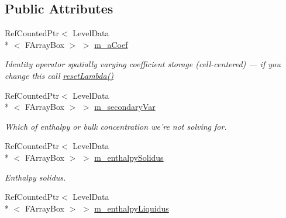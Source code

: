 \subsection*{Public Attributes}
\begin{DoxyCompactItemize}
\item 
\hypertarget{class_a_m_r_non_linear_v_c_op_ac338ad3b423fc508795f783a30b0eb7c}{Ref\-Counted\-Ptr$<$ Level\-Data\\*
$<$ F\-Array\-Box $>$ $>$ \hyperlink{class_a_m_r_non_linear_v_c_op_ac338ad3b423fc508795f783a30b0eb7c}{m\-\_\-a\-Coef}}\label{class_a_m_r_non_linear_v_c_op_ac338ad3b423fc508795f783a30b0eb7c}

\begin{DoxyCompactList}\small\item\em Identity operator spatially varying coefficient storage (cell-\/centered) --- if you change this call \hyperlink{class_a_m_r_non_linear_v_c_op_add4e1fcde22b295a038e786cf0c1152a}{reset\-Lambda()} \end{DoxyCompactList}\item 
\hypertarget{class_a_m_r_non_linear_v_c_op_a6e44e525541b678e49dddf508a75c880}{Ref\-Counted\-Ptr$<$ Level\-Data\\*
$<$ F\-Array\-Box $>$ $>$ \hyperlink{class_a_m_r_non_linear_v_c_op_a6e44e525541b678e49dddf508a75c880}{m\-\_\-secondary\-Var}}\label{class_a_m_r_non_linear_v_c_op_a6e44e525541b678e49dddf508a75c880}

\begin{DoxyCompactList}\small\item\em Which of enthalpy or bulk concentration we're not solving for. \end{DoxyCompactList}\item 
\hypertarget{class_a_m_r_non_linear_v_c_op_a46cb57e3f91ff79146559815861f86f8}{Ref\-Counted\-Ptr$<$ Level\-Data\\*
$<$ F\-Array\-Box $>$ $>$ \hyperlink{class_a_m_r_non_linear_v_c_op_a46cb57e3f91ff79146559815861f86f8}{m\-\_\-enthalpy\-Solidus}}\label{class_a_m_r_non_linear_v_c_op_a46cb57e3f91ff79146559815861f86f8}

\begin{DoxyCompactList}\small\item\em Enthalpy solidus. \end{DoxyCompactList}\item 
\hypertarget{class_a_m_r_non_linear_v_c_op_a3554fae4dfab2b59184a29ef3256ff15}{Ref\-Counted\-Ptr$<$ Level\-Data\\*
$<$ F\-Array\-Box $>$ $>$ \hyperlink{class_a_m_r_non_linear_v_c_op_a3554fae4dfab2b59184a29ef3256ff15}{m\-\_\-enthalpy\-Liquidus}}\label{class_a_m_r_non_linear_v_c_op_a3554fae4dfab2b59184a29ef3256ff15}


\end{DoxyCompactItemize}
